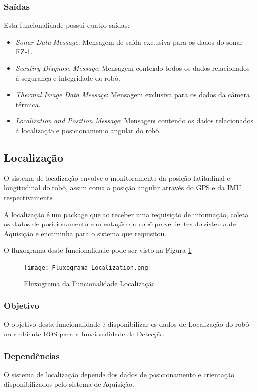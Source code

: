 \subsubsection{Saídas}

Esta funcionalidade possui quatro saídas:

\begin{itemize}
	\item \textit{Sonar Data Message}: Mensagem de saída exclusiva para os dados do sonar EZ-1.
	\item \textit{Secutiry Diagnose Message}: Mensagem contendo todos os dados relacionados à segurança e integridade do robô.
	\item \textit{Thermal Image Data Message}: Mensagem exclusiva para os dados da câmera térmica.
	\item \textit{Localization and Position Message}: Mensagem contendo os dados relacionados á localização e posicionamento angular do robô.
\end{itemize}

\subsection{Localização}
\label{ssec:func2}

O sistema de localização envolve o monitoramento da posição latitudinal e longitudinal do robô, assim como a posição angular através do GPS e da IMU respectivamente.

A localização é um package que ao receber uma requisição de informação, coleta os dados de posicionamento e orientação do robô provenientes do sistema de Aquisição e encaminha para o sistema que requisitou.

O fluxograma deste funcionalidade pode ser visto na Figura \ref{fluxlocal}

\begin{figure}[h!]
	\centering
	\texttt{[image: Fluxograma\_Localization.png]}
	\caption{Fluxograma da Funcionalidade Localização} \label{fluxlocal}
\end{figure}


\subsubsection{Objetivo}
O objetivo desta funcionalidade é disponibilizar os dados de Localização do robô no ambiente ROS para a funcionalidade de Detecção.

\subsubsection{Dependências}
O sistema de localização depende dos dados de posicionamento e orientação disponibilizados pelo sistema de Aquisição.

